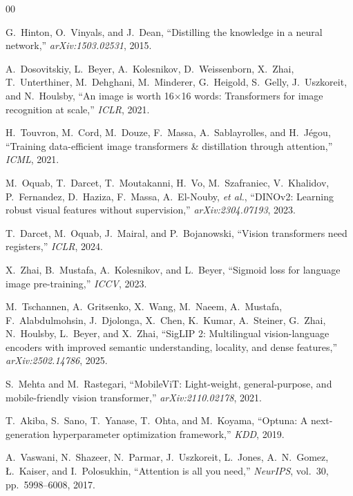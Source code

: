 \documentclass[journal]{IEEEtran}
\begin{document}
\begin{thebibliography}{00}

G.~Hinton, O.~Vinyals, and J.~Dean,
``Distilling the knowledge in a neural network,''
\textit{arXiv:1503.02531}, 2015.

A.~Dosovitskiy, L.~Beyer, A.~Kolesnikov, D.~Weissenborn, X.~Zhai, T.~Unterthiner,
M.~Dehghani, M.~Minderer, G.~Heigold, S.~Gelly, J.~Uszkoreit, and N.~Houlsby,
``An image is worth 16$\times$16 words: Transformers for image recognition at scale,''
\textit{ICLR}, 2021.

H.~Touvron, M.~Cord, M.~Douze, F.~Massa, A.~Sablayrolles, and H.~J\'egou,
``Training data-efficient image transformers \& distillation through attention,''
\textit{ICML}, 2021.

M.~Oquab, T.~Darcet, T.~Moutakanni, H.~Vo, M.~Szafraniec, V.~Khalidov,
P.~Fernandez, D.~Haziza, F.~Massa, A.~El-Nouby, \textit{et al.},
``DINOv2: Learning robust visual features without supervision,''
\textit{arXiv:2304.07193}, 2023.

T.~Darcet, M.~Oquab, J.~Mairal, and P.~Bojanowski,
``Vision transformers need registers,''
\textit{ICLR}, 2024.

X.~Zhai, B.~Mustafa, A.~Kolesnikov, and L.~Beyer,
``Sigmoid loss for language image pre-training,''
\textit{ICCV}, 2023.

M.~Tschannen, A.~Gritsenko, X.~Wang, M.~Naeem, A.~Mustafa, F.~Alabdulmohsin,
J.~Djolonga, X.~Chen, K.~Kumar, A.~Steiner, G.~Zhai, N.~Houlsby, L.~Beyer,
and X.~Zhai,
``SigLIP 2: Multilingual vision-language encoders with improved semantic understanding,
locality, and dense features,''
\textit{arXiv:2502.14786}, 2025.

S.~Mehta and M.~Rastegari,
``MobileViT: Light-weight, general-purpose, and mobile-friendly vision transformer,''
\textit{arXiv:2110.02178}, 2021.

T.~Akiba, S.~Sano, T.~Yanase, T.~Ohta, and M.~Koyama,
``Optuna: A next-generation hyperparameter optimization framework,''
\textit{KDD}, 2019.

A.~Vaswani, N.~Shazeer, N.~Parmar, J.~Uszkoreit, L.~Jones, A.~N.~Gomez,
\L{}.~Kaiser, and I.~Polosukhin,
``Attention is all you need,''
\textit{NeurIPS}, vol.~30, pp.~5998--6008, 2017.


\end{thebibliography}
\end{document}
